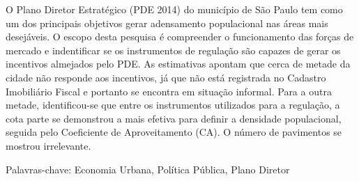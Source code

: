 \documentclass[
  a4paper, 
  12pt, 
  openany, 
  oneside, 
  brazil,
]{abntex2}
\begin{document}
        
        
        

      
  



\setlength{\absparsep}{18pt} %
\begin{resumo}

O Plano Diretor Estratégico (PDE 2014) do município de São Paulo tem como um dos principais objetivos gerar adensamento populacional nas áreas mais desejáveis. O escopo desta pesquisa é compreender o funcionamento das forças de mercado e indentificar se os instrumentos de regulação são capazes de gerar os incentivos almejados pelo PDE. As estimativas apontam que cerca de metade da cidade não responde aos incentivos, já que não está registrada no Cadastro Imobiliário Fiscal e portanto se encontra em situação informal. Para a outra metade, identificou-se que entre os instrumentos utilizados para a regulação, a cota parte se demonstrou a mais efetiva para definir a densidade populacional, seguida pelo Coeficiente de Aproveitamento (CA). O número de pavimentos se mostrou irrelevante. 

Palavras-chave: Economia Urbana, Política Pública, Plano Diretor
\end{resumo}
\end{document}
